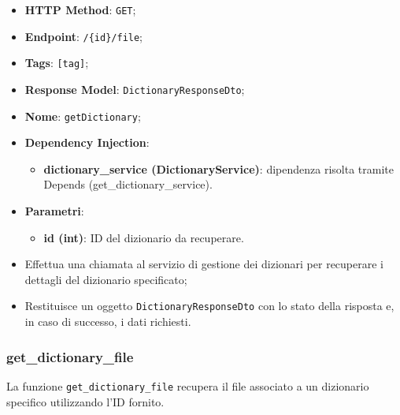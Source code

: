 \begin{itemize}
  \item \textbf{HTTP Method}: \texttt{GET};
  \item \textbf{Endpoint}: \texttt{/\{id\}/file};
  \item \textbf{Tags}: \texttt{[tag]};
  \item \textbf{Response Model}: \texttt{DictionaryResponseDto};
  \item \textbf{Nome}: \texttt{getDictionary};
  \item \textbf{Dependency Injection}:
  \begin{itemize}
    \item \textbf{dictionary\_service (DictionaryService)}: dipendenza risolta tramite Depends (get\_dictionary\_service).
  \end{itemize}
  \item \textbf{Parametri}:
  \begin{itemize}
    \item \textbf{id (int)}: ID del dizionario da recuperare.
  \end{itemize}
\end{itemize}

\begin{itemize}
  \item Effettua una chiamata al servizio di gestione dei dizionari per recuperare i dettagli del dizionario specificato;
  \item Restituisce un oggetto \texttt{DictionaryResponseDto} con lo stato della risposta e, in caso di successo, i dati richiesti.
\end{itemize}

\subsubsection{get\_dictionary\_file}

\par La funzione \texttt{get\_dictionary\_file} recupera il file associato a un dizionario specifico utilizzando l'ID fornito.

